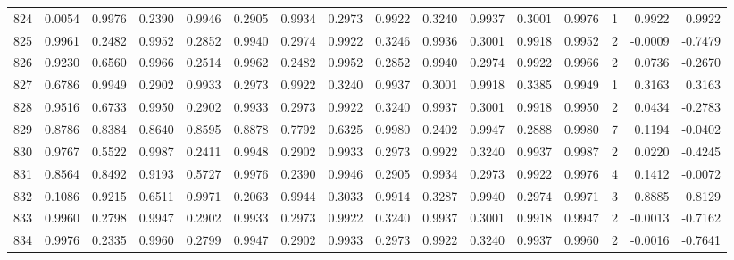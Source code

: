 \begin{tabular}{lrrrrrrrrrrrrrrr}
824 &      0.0054 &  0.9976 &  0.2390 &  0.9946 &  0.2905 &  0.9934 &  0.2973 &  0.9922 &  0.3240 &  0.9937 &   0.3001 &     0.9976 &      1 &                    0.9922 &                     0.9922 \\
825 &      0.9961 &  0.2482 &  0.9952 &  0.2852 &  0.9940 &  0.2974 &  0.9922 &  0.3246 &  0.9936 &  0.3001 &   0.9918 &     0.9952 &      2 &                   -0.0009 &                    -0.7479 \\
826 &      0.9230 &  0.6560 &  0.9966 &  0.2514 &  0.9962 &  0.2482 &  0.9952 &  0.2852 &  0.9940 &  0.2974 &   0.9922 &     0.9966 &      2 &                    0.0736 &                    -0.2670 \\
827 &      0.6786 &  0.9949 &  0.2902 &  0.9933 &  0.2973 &  0.9922 &  0.3240 &  0.9937 &  0.3001 &  0.9918 &   0.3385 &     0.9949 &      1 &                    0.3163 &                     0.3163 \\
828 &      0.9516 &  0.6733 &  0.9950 &  0.2902 &  0.9933 &  0.2973 &  0.9922 &  0.3240 &  0.9937 &  0.3001 &   0.9918 &     0.9950 &      2 &                    0.0434 &                    -0.2783 \\
829 &      0.8786 &  0.8384 &  0.8640 &  0.8595 &  0.8878 &  0.7792 &  0.6325 &  0.9980 &  0.2402 &  0.9947 &   0.2888 &     0.9980 &      7 &                    0.1194 &                    -0.0402 \\
830 &      0.9767 &  0.5522 &  0.9987 &  0.2411 &  0.9948 &  0.2902 &  0.9933 &  0.2973 &  0.9922 &  0.3240 &   0.9937 &     0.9987 &      2 &                    0.0220 &                    -0.4245 \\
831 &      0.8564 &  0.8492 &  0.9193 &  0.5727 &  0.9976 &  0.2390 &  0.9946 &  0.2905 &  0.9934 &  0.2973 &   0.9922 &     0.9976 &      4 &                    0.1412 &                    -0.0072 \\
832 &      0.1086 &  0.9215 &  0.6511 &  0.9971 &  0.2063 &  0.9944 &  0.3033 &  0.9914 &  0.3287 &  0.9940 &   0.2974 &     0.9971 &      3 &                    0.8885 &                     0.8129 \\
833 &      0.9960 &  0.2798 &  0.9947 &  0.2902 &  0.9933 &  0.2973 &  0.9922 &  0.3240 &  0.9937 &  0.3001 &   0.9918 &     0.9947 &      2 &                   -0.0013 &                    -0.7162 \\
834 &      0.9976 &  0.2335 &  0.9960 &  0.2799 &  0.9947 &  0.2902 &  0.9933 &  0.2973 &  0.9922 &  0.3240 &   0.9937 &     0.9960 &      2 &                   -0.0016 &                    -0.7641 \\

\end{tabular}
